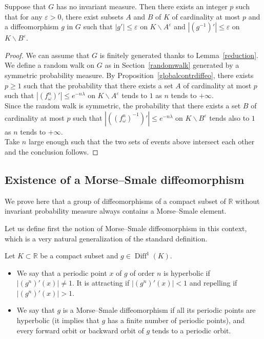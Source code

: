 \documentclass[AHL,Unicode,longabstracts,published]{cedram}
\DeclareMathOperator{\Diff}{Diff}
\newcommand{\R}{\mathbb{R}}
\newcommand{\ep}{\varepsilon}
\newcommand{\R}{\mathbb{R}}
\begin{document}
\begin{coro}\label{smoothcontract}
Suppose that $G$ has no invariant measure. Then there exists an integer $p$ such that for any $\ep>0$, there exist subsets $A$ and $B$ of $K$ of cardinality at most $p$ and a diffeomorphism $g$ in $G$ such that $|g'|\leq \ep$ on $K\backslash A^\ep$ and $|(g^{-1})'|\leq \ep$ on $K\backslash B^\ep$.
\end{coro}

\begin{proof}
We can assume that $G$ is finitely generated thanks to Lemma~\ref{reduction}. We define a random walk on $G$ as in Section~\ref{randomwalk} generated by a symmetric probability measure. By Proposition~\ref{globalcontrdiffeo}, there exists $p \geq 1$ such that the probability that there exists a set $A$ of cardinality at most $p$ such that $|(f_\omega^n)'|\leq e^{-n\lambda}$ on $K\backslash A^\ep$ tends to $1$ as $n$ tends to $+\infty$.\\
Since the random walk is symmetric, the probability that there exists a set $B$ of cardinality at most $p$ such that $|((f_\omega^n)^{-1})'|\leq e^{-n\lambda}$ on $K\backslash B^\ep$ tends also to $1$ as $n$ tends to $+\infty$.\\
Take $n$ large enough such that the two sets of events above intersect each other and the conclusion follows.
\end{proof}

\subsection{Existence of a Morse--Smale diffeomorphism}

We prove here that a group of diffeomorphisms of a compact subset of $\R$ without invariant probability measure always contains a Morse--Smale element.

Let us define first the notion of Morse--Smale diffeomorphism in this context, which is a very natural generalization of the standard definition.

\begin{defi}
Let $K\subset \R$ be a compact subset and $g\in \Diff^1(K)$.
\begin{itemize}
\item We say that a periodic point $x$ of $g$ of order $n$ is hyperbolic if $|(g^n)'(x)|\not=1$. It is attracting if $|(g^n)'(x)|<1$ and repelling if $|(g^n)'(x)|>1$.
\item We say that $g$ is a Morse--Smale diffeomorphism if all its periodic points are hyperbolic (it implies that $g$ has a finite number of periodic points), and every forward orbit or backward orbit of $g$ tends to a periodic orbit.
\end{itemize}
\end{defi}
\end{document}
